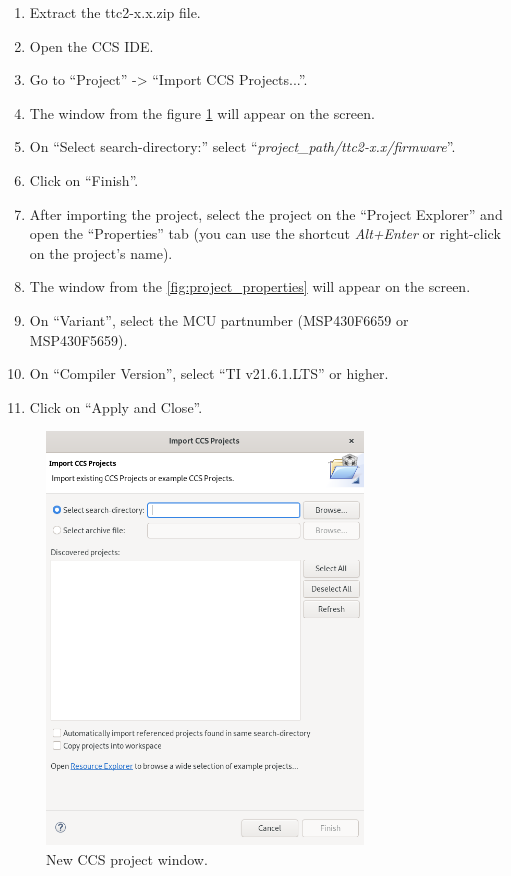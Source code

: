 \begin{enumerate}
    \item Extract the ttc2-x.x.zip file.  
    \item Open the CCS IDE.
    \item Go to ``Project'' -> ``Import CCS Projects...''.
    \item The window from the figure \ref{fig:compiling-tutorial} will appear on the screen.
    \item On ``Select search-directory:'' select ``\textit{project\_path/ttc2-x.x/firmware}''.
    \item Click on ``Finish''.
    
    \item After importing the project, select the project on the ``Project Explorer'' and open the ``Properties'' tab (you can use the shortcut \textit{Alt+Enter} or right-click on the project's name). 
    \item The window from the \autoref{fig:project_properties} will appear on the screen.
    \item On ``Variant'', select the MCU partnumber (MSP430F6659 or MSP430F5659).
    \item On ``Compiler Version'', select ``TI v21.6.1.LTS'' or higher.
    \item Click on ``Apply and Close''.
\end{enumerate}

\begin{figure}[!h]
	\begin{center}
		\includegraphics[width=0.75\textwidth]{figures/ccs_project.png}
		\caption{New CCS project window.}
		\label{fig:compiling-tutorial}
	\end{center}
\end{figure}

